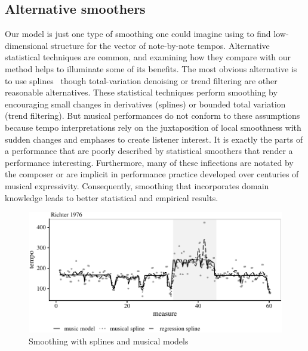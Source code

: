 \documentclass[aoas]{imsart}
\begin{document}
\subsection{Alternative smoothers}
\label{sec:altern-smooth}

Our model is just one type of smoothing one could imagine using to
find low-dimensional structure for the vector of note-by-note
tempos. Alternative statistical techniques are common, and examining
how they compare with our method helps to illuminate some of its
benefits. The most obvious alternative is to use 
splines~\citep{CravenWahba1978,Wahba1990} though total-variation
denoising or trend filtering \citep{KimKoh2009,Tibshirani2014} are
other reasonable alternatives.
These statistical techniques perform smoothing by encouraging small
changes in derivatives (splines) or bounded total variation
(trend filtering). 
But musical performances do not conform to these assumptions because tempo interpretations rely on the juxtaposition of local smoothness
with sudden changes and emphases to create listener interest. It is
exactly the parts of a performance that are poorly described by
statistical smoothers that render a performance
interesting. Furthermore, many of these
inflections are notated by the 
composer or are implicit in performance practice developed over
centuries of musical expressivity. Consequently, smoothing that
incorporates domain knowledge leads to better statistical and
empirical results.
\begin{figure}[t]
  \centering
  \includegraphics[width=.9\linewidth]{alternative-smoothers-1}
  \caption{Smoothing with splines and musical models}
  \label{fig:splines}
\end{figure}
\end{document}
